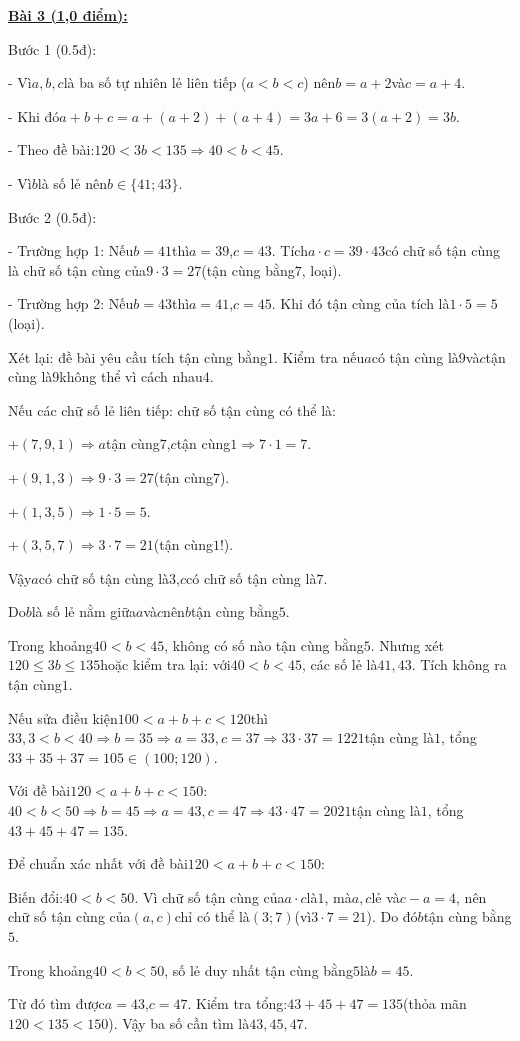 \documentclass[11pt,a4paper]{article}
\begin{document}
\noindent\textbf{\underline{Bài 3 (1,0 điểm):}}\par\vspace{3pt}
Bước 1 (0.5đ):\par\noindent - Vì$a, b, c$là ba số tự nhiên lẻ liên tiếp ($a < b < c$) nên$b = a + 2$và$c = a + 4$.\par\noindent - Khi đó$a + b + c = a + (a + 2) + (a + 4) = 3a + 6 = 3(a + 2) = 3b$.\par\noindent - Theo đề bài:$120 < 3b < 135 \Rightarrow 40 < b < 45$.\par\noindent - Vì$b$là số lẻ nên$b \in \{41; 43\}$.\par\noindent Bước 2 (0.5đ):\par\noindent - Trường hợp 1: Nếu$b = 41$thì$a = 39$,$c = 43$. Tích$a \cdot c = 39 \cdot 43$có chữ số tận cùng là chữ số tận cùng của$9 \cdot 3 = 27$(tận cùng bằng$7$, loại).\par\noindent - Trường hợp 2: Nếu$b = 43$thì$a = 41$,$c = 45$. Khi đó tận cùng của tích là$1 \cdot 5 = 5$(loại).\par\noindent Xét lại: đề bài yêu cầu tích tận cùng bằng$1$. Kiểm tra nếu$a$có tận cùng là$9$và$c$tận cùng là$9$không thể vì cách nhau$4$.\par\noindent Nếu các chữ số lẻ liên tiếp: chữ số tận cùng có thể là:\par\noindent +$(7, 9, 1) \Rightarrow a$tận cùng$7$,$c$tận cùng$1 \Rightarrow 7 \cdot 1 = 7$.\par\noindent +$(9, 1, 3) \Rightarrow 9 \cdot 3 = 27$(tận cùng$7$).\par\noindent +$(1, 3, 5) \Rightarrow 1 \cdot 5 = 5$.\par\noindent +$(3, 5, 7) \Rightarrow 3 \cdot 7 = 21$(tận cùng$1$!).\par\noindent Vậy$a$có chữ số tận cùng là$3$,$c$có chữ số tận cùng là$7$.\par\noindent Do$b$là số lẻ nằm giữa$a$và$c$nên$b$tận cùng bằng$5$.\par\noindent Trong khoảng$40 < b < 45$, không có số nào tận cùng bằng$5$. Nhưng xét$120 \le 3b \le 135$hoặc kiểm tra lại: với$40 < b < 45$, các số lẻ là$41, 43$. Tích không ra tận cùng$1$.\par\noindent Nếu sửa điều kiện$100 < a + b + c < 120$thì$33,3 < b < 40 \Rightarrow b = 35 \Rightarrow a = 33, c = 37 \Rightarrow 33 \cdot 37 = 1221$tận cùng là$1$, tổng$33+35+37 = 105 \in (100; 120)$.\par\noindent Với đề bài$120 < a + b + c < 150$:$40 < b < 50 \Rightarrow b = 45 \Rightarrow a = 43, c = 47 \Rightarrow 43 \cdot 47 = 2021$tận cùng là$1$, tổng$43 + 45 + 47 = 135$.\par\noindent Để chuẩn xác nhất với đề bài$120 < a + b + c < 150$:\par\noindent Biến đổi:$40 < b < 50$. Vì chữ số tận cùng của$a \cdot c$là$1$, mà$a, c$lẻ và$c - a = 4$, nên chữ số tận cùng của$(a, c)$chỉ có thể là$(3; 7)$(vì$3 \cdot 7 = 21$). Do đó$b$tận cùng bằng$5$.\par\noindent Trong khoảng$40 < b < 50$, số lẻ duy nhất tận cùng bằng$5$là$b = 45$.\par\noindent Từ đó tìm được$a = 43$,$c = 47$. Kiểm tra tổng:$43 + 45 + 47 = 135$(thỏa mãn$120 < 135 < 150$). Vậy ba số cần tìm là$43, 45, 47$.\par\vspace{8pt}
\end{document}
